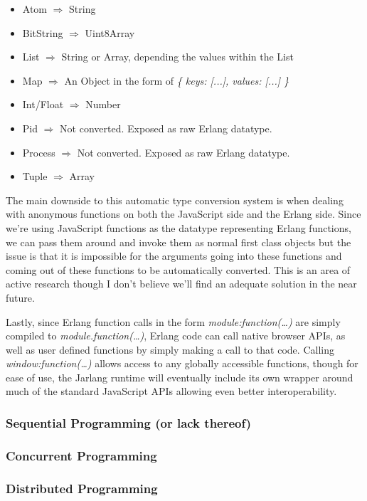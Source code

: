 \documentclass[twoside,12pt,titlepage,a4paper]{article}
\begin{document}
\begin{itemize}
\item Atom $\Rightarrow$ String
\item BitString $\Rightarrow$ Uint8Array
\item List $\Rightarrow$ String or Array, depending the values within the List
\item Map $\Rightarrow$ An Object in the form of \textit{\{ keys: [...], values: [...] \}}
\item Int/Float $\Rightarrow$ Number
\item Pid $\Rightarrow$ Not converted. Exposed as raw Erlang datatype.
\item Process $\Rightarrow$ Not converted. Exposed as raw Erlang datatype.
\item Tuple $\Rightarrow$ Array
\end{itemize}

The main downside to this automatic type conversion system is when dealing with anonymous functions on both the JavaScript side and the Erlang side. Since we're using JavaScript functions as the datatype representing Erlang functions, we can pass them around and invoke them as normal first class objects but the issue is that it is impossible for the arguments going into these functions and coming out of these functions to be automatically converted. This is an area of active research though I don't believe we'll find an adequate solution in the near future.

Lastly, since Erlang function calls in the form \textit{module:function(\dots)} are simply compiled to \textit{module.function(\dots)}, Erlang code can call native browser APIs, as well as user defined functions by simply making a call to that code. Calling \textit{window:function(\dots)} allows access to any globally accessible functions, though for ease of use, the Jarlang runtime will eventually include its own wrapper around much of the standard JavaScript APIs allowing even better interoperability.

\subsubsection{Sequential Programming (or lack thereof)}
\subsubsection{Concurrent Programming} \label{sssec:num2}
\subsubsection{Distributed Programming}
\end{document}
